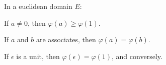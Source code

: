 In a euclidean domain $E$:

 If $a \neq 0$, then $\varphi(a) \geq \varphi(1)$.

 If $a$ and $b$ are associates, then $\varphi(a) = \varphi(b)$.

 If $\epsilon$ is a unit, then $\varphi(\epsilon) = \varphi(1)$, and conversely.
